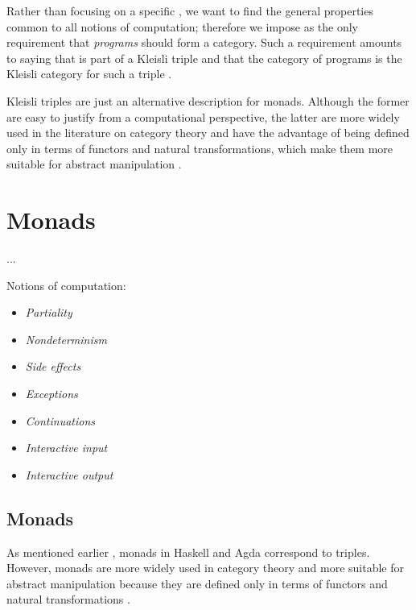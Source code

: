 Rather than focusing on a specific , we want to find the
general properties common to all notions of computation; therefore we
impose as the only requirement that \emph{programs} should form a
category. Such a requirement amounts to saying that  is part
of a Kleisli triple and that the category of programs is the Kleisli
category for such a triple \parencite[58]{moggi-1991}.

Kleisli triples are just an alternative description for monads.
Although the former are easy to justify from a computational
perspective, the latter are more widely used in the literature on
category theory and have the advantage of being defined only in terms
of functors and natural transformations, which make them more suitable
for abstract manipulation \parencite[60]{moggi-1991}.

\section{Monads}
\label{sec:monads}

...



\begin{examples}
  \label{ex:notions-computation}


  Notions of computation:
  \begin{itemize}
  \item
    \emph{Partiality}
  \item
    \emph{Nondeterminism}
  \item
    \emph{Side effects}
  \item
    \emph{Exceptions}
  \item
    \emph{Continuations}
  \item
    \emph{Interactive input}
  \item
    \emph{Interactive output}
  \end{itemize}
\end{examples}

\subsection*{Monads}

As mentioned earlier , monads in Haskell and Agda
correspond to triples. However, monads are more widely used in
category theory and more suitable for abstract manipulation because
they are defined only in terms of functors and natural transformations
\parencite[60]{moggi-1991}.

